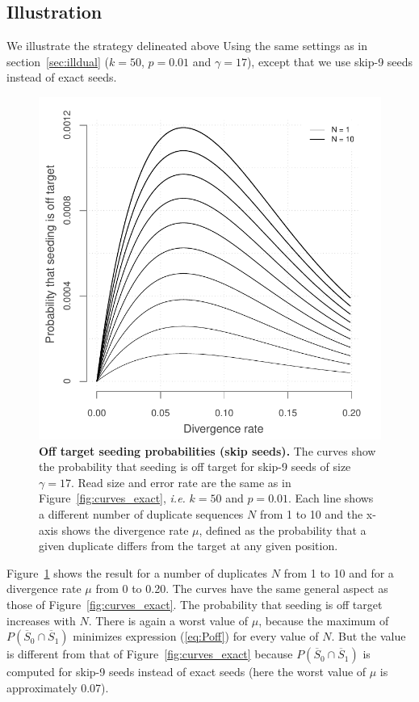 \documentclass{article}
\begin{document}
\subsection{Illustration}
\label{sec:illskipdual}

We illustrate the strategy delineated above Using the same settings as in
section~\ref{sec:illdual} ($k=50$, $p=0.01$ and $\gamma=17$), except that
we use skip-9 seeds instead of exact seeds.

\begin{figure}[h]
\centering
\includegraphics[scale=0.65]{curves_skip.pdf}
\caption{\textbf{Off target seeding probabilities (skip seeds).}
The curves show the probability that seeding is off target for skip-9
seeds of size $\gamma=17$. Read size and error rate are the same as in
Figure~\ref{fig:curves_exact}, \textit{i.e.} $k=50$ and $p=0.01$. Each line
shows a different number of duplicate sequences $N$ from 1 to 10 and the
x-axis shows the divergence rate $\mu$, defined as the probability that a
given duplicate differs from the target at any given position.}
\label{fig:curves_skip}
\end{figure}

Figure~\ref{fig:curves_skip} shows the result for a number of duplicates $N$
from 1 to 10 and for a divergence rate $\mu$ from 0 to 0.20. The curves
have the same general aspect as those of Figure~\ref{fig:curves_exact}. The
probability that seeding is off target increases with $N$. There is again
a  worst value of $\mu$, because the maximum of $P(\overline{S}_0 \cap
\overline{S}_1)$ minimizes expression (\ref{eq:Poff}) for every value of
$N$. But the value is different from that of Figure~\ref{fig:curves_exact}
because $P(\overline{S}_0 \cap \overline{S}_1)$ is computed for skip-9
seeds instead of exact seeds (here the worst value of $\mu$ is
approximately 0.07).
\end{document}
